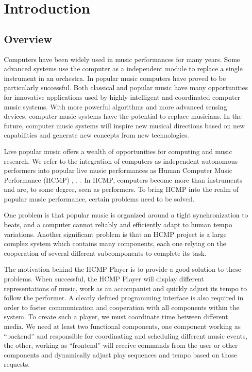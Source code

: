 \chapter{Introduction}

\section{Overview}
Computers have been widely used in music performances for many years. Some
advanced systems use the computer as a independent module to replace a
single instrument in an orchestra. In popular music computers have proved
to be particularly successful. Both classical and popular music have many
opportunities for innovative applications used by highly intelligent and
coordinated computer music systems. With more powerful algorithms and more
advanced sensing devices, computer music systems have the potential to
replace musicians. In the future, computer music systems will inspire new 
musical directions based on new
capabilities and generate new concepts from new technologies.

Live popular music offers a wealth of opportunities for computing and music
research.  We refer to the integration of computers as independent autonomous
performers into popular live music performances as Human Computer Music
Performance (HCMP) \cite{Hcmp0}, \cite{Hcmp1}, \cite{Dannenberga}. In HCMP, computers become more than instruments and are,
to some degree, seen as performers. To bring HCMP into the realm of popular
music performance, certain problems need to be solved. 

One problem is that
popular music is organized around a tight synchronization to beats, and a
computer cannot reliably and efficiently adapt to human tempo variations.
Another significant problem is that an HCMP project is a large complex
system which contains many components, each one relying on the cooperation of several
different subcomponents to complete its task.

The motivation behind the HCMP Player is to provide a good solution to these
problems. When successful, the HCMP Player will display different
representations of music, work as an accompanist and quickly adjust its
tempo to follow the performer. A clearly defined programming interface is
also required in order to foster communication and cooperation with all
components within the system. To create such a player, we must coordinate
time between different media. We need at least two functional components,
one component working as ``backend'' and responsible for coordinating and
scheduling different music events, the other, working as ``frontend'' will
receive commands from the user or other components and dynamically adjust
play sequences and tempo based on those requests.

